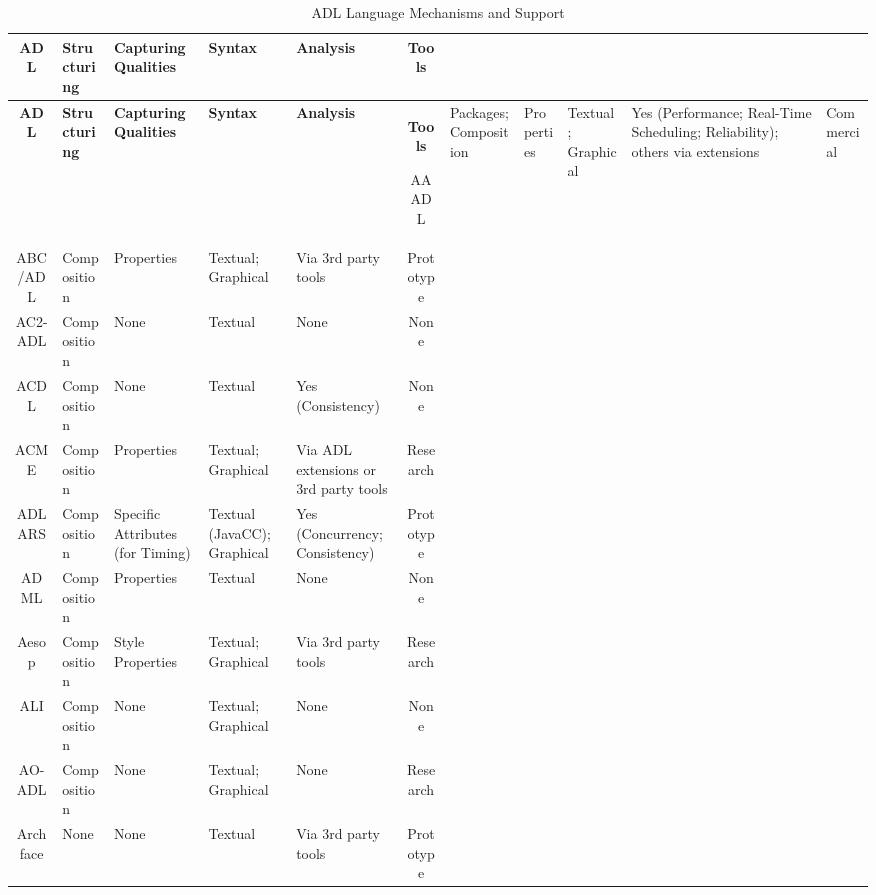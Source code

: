 \begin{landscape}
\footnotesize
\begin{longtable}{|c|P{2cm}|P{3cm}|P{3cm}|p{2cm}|c|} 
\caption{ADL Language Mechanisms and Support} \label{table:adl-mechanisms} \\
\hline
\textbf{ADL} & \textbf{Structuring} & \textbf{Capturing Qualities} & \textbf{Syntax} & \textbf{Analysis} & \textbf{Tools} \endfirsthead
\caption[]{ADL Language Mechanisms and Support} \\
\hline
\textbf{ADL} & \textbf{Structuring} & \textbf{Capturing Qualities} & \textbf{Syntax} & \textbf{Analysis} & \textbf{Tools} \endhead
\hline

AAADL & Packages; Composition & Properties & Textual; Graphical & Yes (Performance; Real-Time Scheduling; Reliability); others via extensions & Commercial \\
\hline

ABC/ADL & Composition & Properties & Textual; Graphical & Via 3rd party tools & Prototype \\
\hline

AC2-ADL & Composition & None & Textual & None & None \\
\hline
ACDL & Composition & None & Textual & Yes (Consistency) & None \\ 
\hline

ACME & Composition & Properties & Textual; Graphical & Via ADL extensions or 3rd party tools & Research \\ 
\hline

ADLARS & Composition & Specific Attributes (for Timing) & Textual (JavaCC); Graphical & Yes (Concurrency; Consistency) & Prototype \\ 
\hline

ADML & Composition & Properties & Textual & None & None \\ 
\hline

Aesop & Composition & Style Properties & Textual; Graphical & Via 3rd party tools & Research \\ 
\hline

ALI & Composition & None & Textual; Graphical & None & None \\ 
\hline

AO-ADL & Composition & None & Textual; Graphical & None & Research \\ 
\hline

Archface & None & None & Textual & Via 3rd party tools & Prototype \\ 
\hline


\end{longtable}
\end{landscape}
